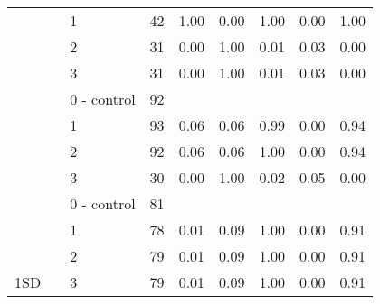 \begin{table}[H]
\begin{tabular}[t]{lllrrrrll}
 &  & 1 & 42 & 1.00 & 0.00 & 1.00 & 0.00 & 1.00\\

 &  & 2 & 31 & 0.00 & 1.00 & 0.01 & 0.03 & 0.00\\

 & \multirow[t]{-4}{*}{\raggedright\arraybackslash 1} & 3 & 31 & 0.00 & 1.00 & 0.01 & 0.03 & 0.00\\

 &  & 0 - control & 92 &  &  &  &  & \\

 &  & 1 & 93 & 0.06 & 0.06 & 0.99 & 0.00 & 0.94\\

 &  & 2 & 92 & 0.06 & 0.06 & 1.00 & 0.00 & 0.94\\

 & \multirow[t]{-4}{*}{\raggedright\arraybackslash 2} & 3 & 30 & 0.00 & 1.00 & 0.02 & 0.05 & 0.00\\

 &  & 0 - control & 81 &  &  &  &  & \\

 &  & 1 & 78 & 0.01 & 0.09 & 1.00 & 0.00 & 0.91\\

 &  & 2 & 79 & 0.01 & 0.09 & 1.00 & 0.00 & 0.91\\

\multirow[t]{-12}{*}{\raggedright\arraybackslash 1SD} & \multirow[t]{-4}{*}{\raggedright\arraybackslash 3} & 3 & 79 & 0.01 & 0.09 & 1.00 & 0.00 & 0.91\\
\bottomrule
\end{tabular}
\end{table}
